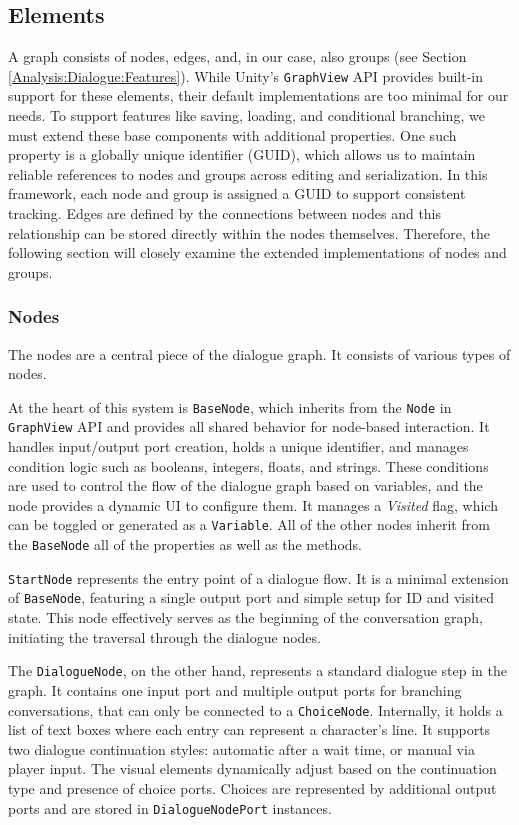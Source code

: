 \subsection{Elements}
A graph consists of nodes, edges, and, in our case, also groups (see Section \ref{Analysis:Dialogue:Features}). While Unity’s \verb|GraphView| API provides built-in support for these elements, their default implementations are too minimal for our needs. To support features like saving, loading, and conditional branching, we must extend these base components with additional properties. One such property is a globally unique identifier (GUID), which allows us to maintain reliable references to nodes and groups across editing and serialization. In this framework, each node and group is assigned a GUID to support consistent tracking. Edges are defined by the connections between nodes and this relationship can be stored directly within the nodes themselves. Therefore, the following section will closely examine the extended implementations of nodes and groups.


\subsubsection{Nodes}
The nodes are a central piece of the dialogue graph. It consists of various types of nodes.

At the heart of this system is \verb|BaseNode|, which inherits from the \verb|Node| in \verb|GraphView| API and provides all shared behavior for node-based interaction. It handles input/output port creation, holds a unique identifier, and manages condition logic such as booleans, integers, floats, and strings. These conditions are used to control the flow of the dialogue graph based on variables, and the node provides a dynamic UI to configure them. It manages a \textit{Visited} flag, which can be toggled or generated as a \verb|Variable|. All of the other nodes inherit from the \verb|BaseNode| all of the properties as well as the methods.

\verb|StartNode| represents the entry point of a dialogue flow. It is a minimal extension of \verb|BaseNode|, featuring a single output port and simple setup for ID and visited state. This node effectively serves as the beginning of the conversation graph, initiating the traversal through the dialogue nodes.

 The \verb|DialogueNode|, on the other hand, represents a standard dialogue step in the graph. It contains one input port and multiple output ports for branching conversations, that can only be connected to a \verb|ChoiceNode|. Internally, it holds a list of text boxes where each entry can represent a character's line. It supports two dialogue continuation styles: automatic after a wait time, or manual via player input. The visual elements dynamically adjust based on the continuation type and presence of choice ports. Choices are represented by additional output ports and are stored in \verb|DialogueNodePort| instances.


